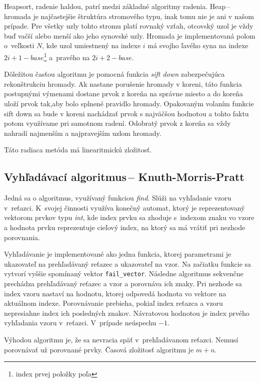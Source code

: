 \documentclass[11pt,a4paper]{article}
\begin{document}
	Heapsort, radenie haldou, patrí medzi základné algoritmy radenia. Heap\,--\,hromada je
    najčastejšie štruktúra stromového typu, inak tomu nie je ani v našom prípade.
    Pre všetky uzly tohto stromu platí rovnaký vzťah, otcovský uzol je vždy buď
    vačší alebo menší ako jeho synovské uzly. Hromada je implementovaná polom o~veľkosti $N$,
    kde uzol umiestnený na indexe $i$ má svojho ľavého syna na indexe
    $2i+1-base$\footnote{index prvej položky poľa} a~pravého na $2i+2-base$.

	Dôležitou časťou algoritmu je pomocná funkcia \textit{sift down} zabezpečujúca rekonštrukciu hromady. Ak nastane porušenie hromady v koreni, táto funkcia postupnými výmenami dostane prvok z koreňa na správne miesto a do koreňa uloží prvok tak,aby bolo splnené pravidlo hromady. Opakovaným volaním funkcie sift down sa bude v koreni nachádzať prvok s najväčšou hodnotou a tohto faktu potom využívame pri samotnom radení. Odobratý prvok z koreňa sa vždy nahradí najmenším a najpravejším uzlom hromady.

	Táto radiaca metóda má linearitmickú zložitosť.

	\subsection{Vyhľadávací algoritmus\,-- Knuth-Morris-Pratt}

	Jedná sa o algoritmus, využívaný funkciou \textit{find}. Slúži na vyhľadanie vzoru v~reťazci. K~svojej činnosti využíva konečný automat, ktorý je reprezentovaný vektorom prvkov typu \textit{int}, kde index prvku sa zhoduje s~indexom znaku vo vzore a hodnota prvku reprezentuje cieľový index, na ktorý sa má vrátiť pri nezhode porovnania.

	Vyhľadávanie je implementované ako jedna funkcia, ktorej parametrami je ukazovateľ na prehľadávaný reťazec a ukazovateľ na vzor. Na začiatku funkcie sa vytvorí vyššie spomínaný vektor \texttt{fail\_vector}. Následne algoritmus sekvenčne prechádza prehľadávaný reťazec a vzor a porovnáva ich znaky. Pri nezhode sa index vzoru nastaví na hodnotu, ktorej odpovedá hodnota vo vektore na aktuálnom indexe. Porovnávanie prebieha, pokiaľ index reťazca a vzoru nepresiahne	index ich posledných znakov. Návratovou hodnotou je index prvého vyhľadania vzoru v~reťazci. V~prípade neúspechu $-1$.

	Výhodou algoritmu je, že sa nevracia späť v~prehľadávanom reťazci. Nemusí porovnávať už porovnané prvky. Časová zložitosť algoritmu je ${m+n}$.
\end{document}

